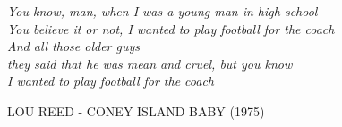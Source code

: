 \documentclass[electronic, oldfontcommands]{kthesis}
\newlength\longest %
\begin{document}
\clearpage

\thispagestyle{empty}
\null\vfill %

\settowidth{}
\begin{center}

\parbox{\longest}{%
	\raggedright{\Large\itshape%
		You know, man, when I was a young man in high school\\ 
		You believe it or not, I wanted to play football for the coach\\
		And all those older guys \\
		they said that he was mean and cruel, but you know \\ 
		I wanted to play football for the coach\par\bigskip
	}   
	\raggedright\MakeUppercase{Lou Reed - Coney Island Baby (1975)}\par%
}
\end{center}

\vfill\vfill

\clearpage

\thispagestyle{empty}
\null\vfill 
\clearpage

\frontmatter %


\newpage






%



	
\end{document}
